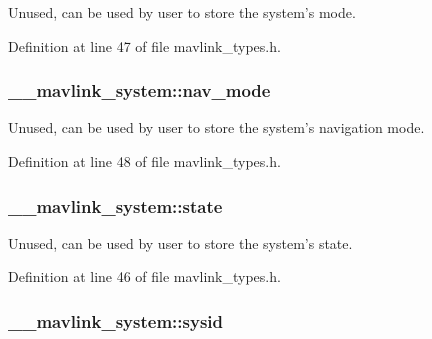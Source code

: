 Unused, can be used by user to store the system's mode. 



Definition at line 47 of file mavlink\-\_\-types.\-h.

\hypertarget{struct____mavlink__system_ae653c03239304982024c03ac165c5011}{
\subsubsection[{nav\-\_\-mode}]{ \-\_\-\-\_\-mavlink\-\_\-system\-::nav\-\_\-mode}}\label{struct____mavlink__system_ae653c03239304982024c03ac165c5011}


Unused, can be used by user to store the system's navigation mode. 



Definition at line 48 of file mavlink\-\_\-types.\-h.

\hypertarget{struct____mavlink__system_ac5afa4a95067ba7b21d4884a740cc413}{
\subsubsection[{state}]{ \-\_\-\-\_\-mavlink\-\_\-system\-::state}}\label{struct____mavlink__system_ac5afa4a95067ba7b21d4884a740cc413}


Unused, can be used by user to store the system's state. 



Definition at line 46 of file mavlink\-\_\-types.\-h.

\hypertarget{struct____mavlink__system_a3533dcc52fcacb13bb3190ae847e8260}{
\subsubsection[{sysid}]{ \-\_\-\-\_\-mavlink\-\_\-system\-::sysid}}\label{struct____mavlink__system_a3533dcc52fcacb13bb3190ae847e8260}


